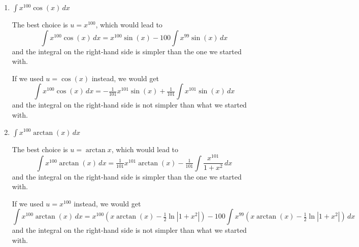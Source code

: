 \documentclass{article}
\begin{document}
\begin{enumerate}
\begin{enumerate}
    \item 
    \begin{problem}
    $\displaystyle \int x^{100} \cos(x)\,dx$
    \end{problem}

        \begin{solution}
        The best choice is $u=x^{100}$, which would lead to
        \[\int x^{100}\cos(x)\,dx = x^{100}\sin(x) - 100\!\int x^{99}\sin (x)\,dx \]
        and the integral on the right-hand side is simpler than the one we started with.

        If we used $u=\cos(x)$ instead, we would get 
        \[\int x^{100}\cos(x)\,dx = -\tfrac{1}{101}x^{101}\sin(x) + \tfrac{1}{101}\int x^{101}\sin(x) \,dx \]
        and the integral on the right-hand side is not simpler than what we started with.
    \end{solution}
    
    \item 
    \begin{problem}
    $\displaystyle \int x^{100} \arctan(x)\,dx$
    \end{problem}

            \begin{solution}
        The best choice is $u=\arctan x$, which would lead to
        \[\int x^{100}\arctan(x)\,dx = \tfrac{1}{101}x^{101}\arctan(x) - \tfrac{1}{101}\int \frac{x^{101}}{1+x^2} \,dx \]
        and the integral on the right-hand side is simpler than the one we started with.

        If we used $u=x^{100}$ instead, we would get 
        \[\int x^{100}\arctan(x)\,dx = x^{100}(x\arctan(x) - \tfrac{1}{2}\ln|1+x^2|) - 100\!\int x^{99}\left(x\arctan(x) - \tfrac{1}{2}\ln|1+x^2|\right)\,dx \]
        and the integral on the right-hand side is not simpler than what we started with.
    \end{solution}
\end{enumerate}


\begin{solution}
    
\end{solution}

\end{enumerate}

\end{document}
